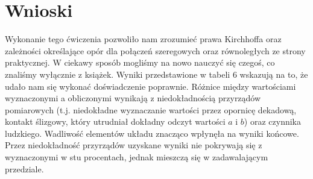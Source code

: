 \documentclass[a4paper,12pts]{article}
\begin{document}

\section{Wnioski}

Wykonanie tego ćwiczenia pozwoliło nam zrozumieć prawa Kirchhoffa oraz zależności określające opór dla połączeń szeregowych oraz równoległych ze strony praktycznej. W ciekawy sposób mogliśmy na nowo nauczyć się czegoś, co znaliśmy wyłącznie z książek. Wyniki przedstawione w tabeli 6 wskazują na to, że udało nam się wykonać doświadczenie poprawnie. Różnice między wartościami wyznaczonymi a obliczonymi wynikają z niedokładnością przyrządów pomiarowych (t.j. niedokładne wyznaczanie wartości przez opornicę dekadową, kontakt ślizgowy, który utrudniał dokładny odczyt wartości $a$ i $b$) oraz czynnika ludzkiego. Wadliwość elementów układu znacząco wpłynęła na wyniki końcowe. Przez niedokładność
 przyrządów uzyskane wyniki nie pokrywają się z wyznaczonymi w stu procentach, jednak mieszczą się w zadawalającym przedziale. 
\end{document}
